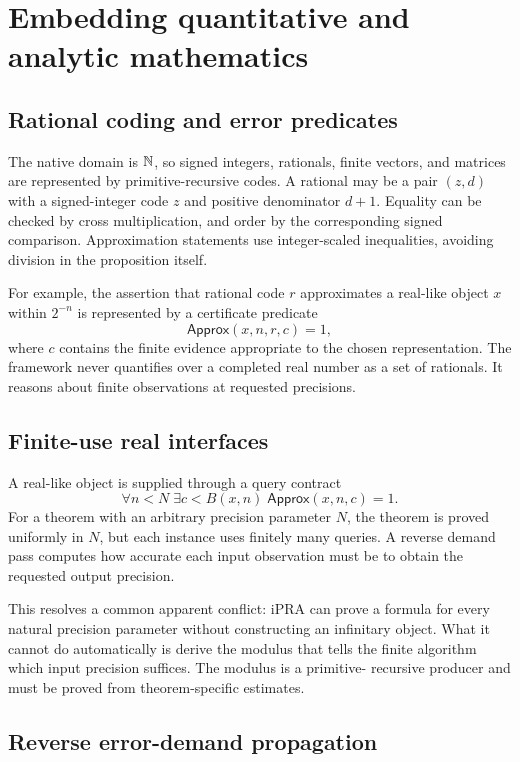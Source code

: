 \section{Embedding quantitative and analytic mathematics}

\subsection{Rational coding and error predicates}

The native domain is \(\mathbb N\), so signed integers, rationals, finite vectors, and
matrices are represented by primitive-recursive codes.  A rational may be a
pair \((z,d)\) with a signed-integer code \(z\) and positive denominator
\(d+1\).  Equality can be checked by cross multiplication, and order by the
corresponding signed comparison.  Approximation statements use integer-scaled
inequalities, avoiding division in the proposition itself.

For example, the assertion that rational code \(r\) approximates a real-like
object \(x\) within \(2^{-n}\) is represented by a certificate predicate
\[
 \mathsf{Approx}(x,n,r,c)=1,
\]
where \(c\) contains the finite evidence appropriate to the chosen
representation.  The framework never quantifies over a completed real number
as a set of rationals.  It reasons about finite observations at requested
precisions.

\subsection{Finite-use real interfaces}

A real-like object is supplied through a query contract
\[
 \forall n<N\;\exists c<B(x,n)\;
   \mathsf{Approx}(x,n,c)=1.
\]
For a theorem with an arbitrary precision parameter \(N\), the theorem is
proved uniformly in \(N\), but each instance uses finitely many queries.  A
reverse demand pass computes how accurate each input observation must be to
obtain the requested output precision.

This resolves a common apparent conflict: iPRA can prove a formula for every
natural precision parameter without constructing an infinitary object.  What
it cannot do automatically is derive the modulus that tells the finite
algorithm which input precision suffices.  The modulus is a primitive-
recursive producer and must be proved from theorem-specific estimates.

\subsection{Reverse error-demand propagation}

